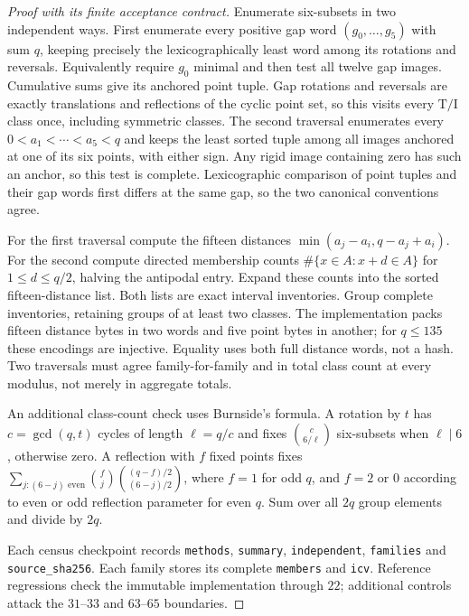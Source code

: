 \documentclass[11pt]{article}
\theoremstyle{remark}
\newcommand{\TI}{\mathrm{T/I}}
\newcommand{\code}[1]{\nolinkurl{#1}}
\begin{document}
\begin{proof}[Proof with its finite acceptance contract]
Enumerate six-subsets in two independent ways. First enumerate every
positive gap word $(g_0,\ldots,g_5)$ with sum $q$, keeping precisely the
lexicographically least word among its rotations and reversals. Equivalently
require $g_0$ minimal and then test all twelve gap images. Cumulative sums
give its anchored point tuple. Gap rotations and reversals are exactly
translations and reflections of the cyclic point set, so this visits every
$\TI$ class once, including symmetric classes. The second traversal
enumerates every $0<a_1<\cdots<a_5<q$ and keeps the least sorted tuple
among all images anchored at one of its six points, with either sign.
Any rigid image containing zero has such an anchor, so this test is complete.
Lexicographic comparison of point tuples and their gap words first differs
at the same gap, so the two canonical conventions agree.

For the first traversal compute the fifteen distances
$\min(a_j-a_i,q-a_j+a_i)$. For the second compute directed membership
counts $\#\{x\in A:x+d\in A\}$ for $1\le d\le q/2$, halving the
antipodal entry. Expand these counts into the sorted fifteen-distance list.
Both lists are exact interval inventories. Group complete inventories,
retaining groups of at least two classes. The implementation packs fifteen
distance bytes in two words and five point bytes in another; for
$q\le135$ these encodings are injective. Equality uses both full distance
words, not a hash. Two traversals must agree family-for-family and in
total class count at every modulus, not merely in aggregate totals.

An additional class-count check uses Burnside's formula. A rotation by
$t$ has $c=\gcd(q,t)$ cycles of length $\ell=q/c$ and fixes
$\binom{c}{6/\ell}$ six-subsets when $\ell\mid6$, otherwise zero.
A reflection with $f$ fixed points fixes
$\sum_{j:(6-j)\text{ even}}\binom f j
\binom{(q-f)/2}{(6-j)/2}$, where $f=1$ for odd $q$, and $f=2$ or
$0$ according to even or odd reflection parameter for even $q$.
Sum over all $2q$ group elements and divide by $2q$.

Each census checkpoint records \code{methods}, \code{summary},
\code{independent}, \code{families} and \code{source_sha256}.
Each family stores its complete \code{members} and \code{icv}.
Reference regressions check the immutable implementation through $22$;
additional controls attack the $31$--$33$ and $63$--$65$ boundaries.


\end{proof}
\end{document}
